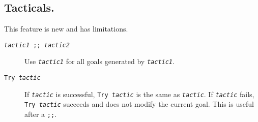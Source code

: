 \subsection{Tacticals.}
This feature is new and has limitations.

\begin{description}
\item[{\tt {\em tactic1}  ;; {\em tactic2}}\idx{;;}]
Use {\tt\em tactic1} for all goals generated by {\tt\em tactic1}.


\item[{\tt Try {\em tactic}}] If {\tt {\em tactic}} is
  successful, {\tt Try {\em tactic}} is the same as {\tt\em tactic}. If
  {\tt {\em tactic}} fails, {\tt Try {\em tactic}} succeeds and does not
  modify the current goal. This is useful after a {\tt ;;}.


\end{description}



